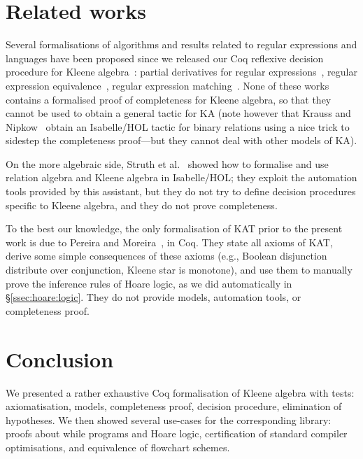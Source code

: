 \documentclass[a4paper]{llncs}
\begin{document}
\section{Related works}
\label{sec:related:works}

Several formalisations of algorithms and results related to regular
expressions and languages have been proposed since we released our Coq
reflexive decision procedure for Kleene algebra~\cite{bp:itp10:kacoq}:
partial derivatives for regular expressions~\cite{AlmeidaMPS10},
regular expression
equivalence~\cite{CoquandS11,KraussN12,Asperti12,MoreiraPS12}, regular
expression matching~\cite{Komendantsky12}. None of these works
contains a formalised proof of completeness for Kleene algebra, so
that they cannot be used to obtain a general tactic for KA (note
however that Krauss and Nipkow~\cite{KraussN12} obtain an Isabelle/HOL
tactic for binary relations using a nice trick to sidestep the
completeness proof---but they cannot deal with other models of KA).

On the more algebraic side, Struth et
al.~\cite{FosterS12,ArmstrongS12} showed how to formalise and use
relation algebra and Kleene algebra in Isabelle/HOL; they exploit the
automation tools provided by this assistant, but they do not try to
define decision procedures specific to Kleene algebra, and they do not
prove completeness.

To the best our knowledge, the only formalisation of KAT prior to the
present work is due to Pereira and Moreira~\cite{PereiraM08}, in Coq.
They state all axioms of KAT, derive some simple consequences of these
axioms (e.g., Boolean disjunction distribute over conjunction, Kleene
star is monotone), and use them to manually prove the inference rules
of Hoare logic, as we did automatically in
§\ref{ssec:hoare:logic}. They do not provide models, automation tools,
or completeness proof.


\section{Conclusion}
\label{ccl}

We presented a rather exhaustive Coq formalisation of Kleene algebra
with tests: axiomatisation, models, completeness proof, decision
procedure, elimination of hypotheses. We then showed several use-cases
for the corresponding library: proofs about while programs and Hoare
logic, certification of standard compiler optimisations, and
equivalence of flowchart schemes.
\end{document}
